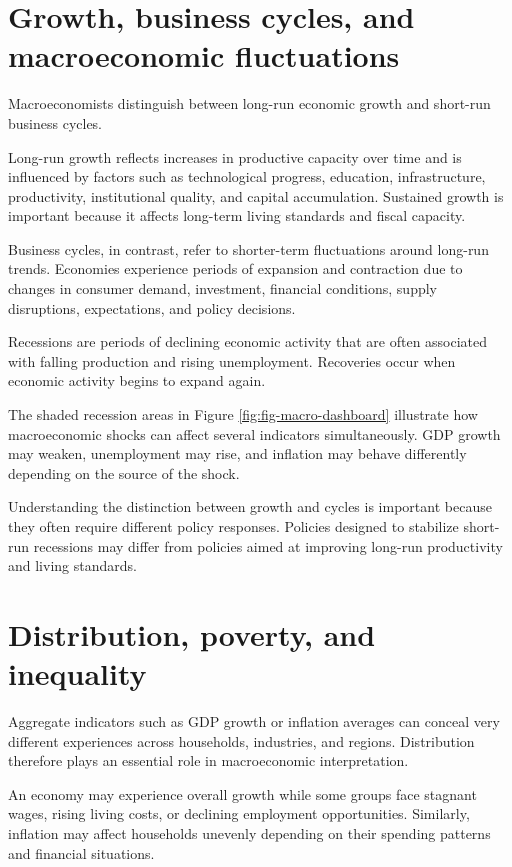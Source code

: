\documentclass[
  11pt,
  oneside]{book}
\begin{document}
\section{Growth, business cycles, and macroeconomic fluctuations}\label{growth-business-cycles-and-macroeconomic-fluctuations}

Macroeconomists distinguish between long-run economic growth and short-run business cycles.

Long-run growth reflects increases in productive capacity over time and is influenced by factors such as technological progress, education, infrastructure, productivity, institutional quality, and capital accumulation. Sustained growth is important because it affects long-term living standards and fiscal capacity.

Business cycles, in contrast, refer to shorter-term fluctuations around long-run trends. Economies experience periods of expansion and contraction due to changes in consumer demand, investment, financial conditions, supply disruptions, expectations, and policy decisions.

Recessions are periods of declining economic activity that are often associated with falling production and rising unemployment. Recoveries occur when economic activity begins to expand again.

The shaded recession areas in Figure \ref{fig:fig-macro-dashboard} illustrate how macroeconomic shocks can affect several indicators simultaneously. GDP growth may weaken, unemployment may rise, and inflation may behave differently depending on the source of the shock.

Understanding the distinction between growth and cycles is important because they often require different policy responses. Policies designed to stabilize short-run recessions may differ from policies aimed at improving long-run productivity and living standards.

\section{Distribution, poverty, and inequality}\label{distribution-poverty-and-inequality}

Aggregate indicators such as GDP growth or inflation averages can conceal very different experiences across households, industries, and regions. Distribution therefore plays an essential role in macroeconomic interpretation.

An economy may experience overall growth while some groups face stagnant wages, rising living costs, or declining employment opportunities. Similarly, inflation may affect households unevenly depending on their spending patterns and financial situations.
\end{document}
